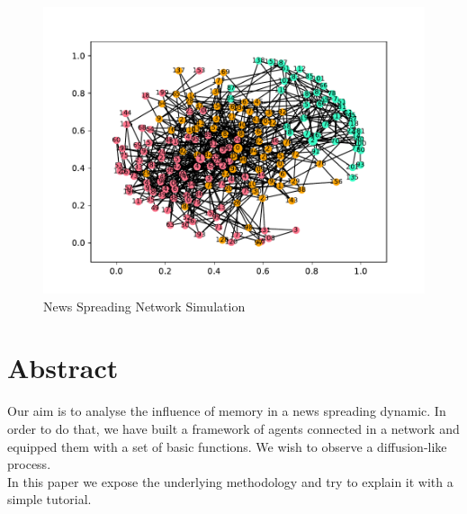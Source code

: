 \begin{figure}[!h]
  \centering
  \includegraphics[trim={2.1cm 2cm 2cm 2cm}, clip, width=\columnwidth]{img/pdf/cover}
  \caption{News Spreading Network Simulation\protect\footnotemark}
  \label{fig:abstract}
\end{figure}
\section*{Abstract}\label{abstract}
Our aim is to analyse the influence of memory in a news spreading dynamic.
In order to do that, we have built a framework of agents connected in a
network and equipped them with a set of basic functions. We wish to
observe a diffusion-like process.\\
In this paper we expose the underlying
methodology and try to explain it with a simple tutorial.

